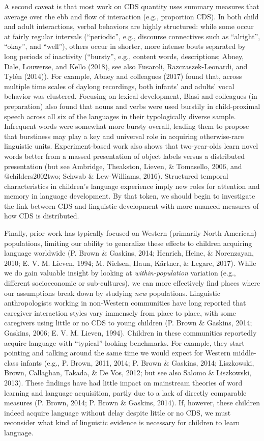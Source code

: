 \documentclass[floatsintext,man]{apa6}
\theoremstyle{definition}
\theoremstyle{definition}
\theoremstyle{definition}
\theoremstyle{remark}
\begin{document}
A second caveat is that most work on CDS quantity uses summary measures
that average over the ebb and flow of interaction (e.g., proportion
CDS). In both child and adult interactions, verbal behaviors are highly
structured: while some occur at fairly regular intervals
(\enquote{periodic}, e.g., discourse connectives such as
\enquote{alright}, \enquote{okay}, and \enquote{well}), others occur in
shorter, more intense bouts separated by long periods of inactivity
(\enquote{bursty}, e.g., content words, descriptions; Abney, Dale,
Louwerse, and Kello (2018), see also Fusaroli, Razczaszek-Leonardi, and
Tylén (2014)). For example, Abney and colleagues (2017) found that,
across multiple time scales of daylong recordings, both infants' and
adults' vocal behavior was clustered. Focusing on lexical development,
Blasi and colleagues (in preparation) also found that nouns and verbs
were used burstily in child-proximal speech across all six of the
languages in their typologically diverse sample. Infrequent words were
somewhat more bursty overall, leading them to propose that burstiness
may play a key and universal role in acquiring otherwise-rare linguistic
units. Experiment-based work also shows that two-year-olds learn novel
words better from a massed presentation of object labels versus a
distributed presentation (but see Ambridge, Theakston, Lieven, \&
Tomasello, 2006, and @childers2002two; Schwab \& Lew-Williams, 2016).
Structured temporal characteristics in children's language experience
imply new roles for attention and memory in language development. By
that token, we should begin to investigate the link between CDS and
linguistic development with more nuanced measures of how CDS is
distributed.

Finally, prior work has typically focused on Western (primarily North
American) populations, limiting our ability to generalize these effects
to children acquiring language worldwide (P. Brown \& Gaskins, 2014;
Henrich, Heine, \& Norenzayan, 2010; E. V. M. Lieven, 1994; M. Nielsen,
Haun, Kärtner, \& Legare, 2017). While we do gain valuable insight by
looking at \emph{within-population} variation (e.g., different
socioeconomic or sub-cultures), we can more effectively find places
where our assumptions break down by studying \emph{new} populations.
Linguistic anthropologists working in non-Western communities have long
reported that caregiver interaction styles vary immensely from place to
place, with some caregivers using little or no CDS to young children (P.
Brown \& Gaskins, 2014; Gaskins, 2006; E. V. M. Lieven, 1994). Children
in these communities reportedly acquire language with
\enquote{typical}-looking benchmarks. For example, they start pointing
and talking around the same time we would expect for Western
middle-class infants (e.g., P. Brown, 2011, 2014; P. Brown \& Gaskins,
2014; Liszkowski, Brown, Callaghan, Takada, \& De Vos, 2012; but see
also Salomo \& Liszkowski, 2013). These findings have had little impact
on mainstream theories of word learning and language acquisition, partly
due to a lack of directly comparable measures (P. Brown, 2014; P. Brown
\& Gaskins, 2014). If, however, these children indeed acquire language
without delay despite little or no CDS, we must reconsider what kind of
linguistic evidence is necessary for children to learn language.
\end{document}
